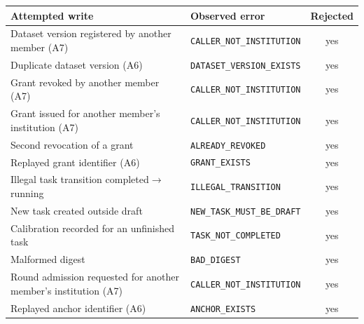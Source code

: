 \begin{widetable}
\centering
\caption{Write-side negative tests on Fabric: each forbidden ledger write and the chaincode error observed.}
\label{tab:negwrites}
\small
\begin{tabular}{p{}p{}c}
\toprule
Attempted write & Observed error & Rejected \\
\midrule
Dataset version registered by another member (A7) & \texttt{CALLER\_NOT\_INSTITUTION} & yes \\
Duplicate dataset version (A6) & \texttt{DATASET\_VERSION\_EXISTS} & yes \\
Grant revoked by another member (A7) & \texttt{CALLER\_NOT\_INSTITUTION} & yes \\
Grant issued for another member's institution (A7) & \texttt{CALLER\_NOT\_INSTITUTION} & yes \\
Second revocation of a grant & \texttt{ALREADY\_REVOKED} & yes \\
Replayed grant identifier (A6) & \texttt{GRANT\_EXISTS} & yes \\
Illegal task transition completed$\to$running & \texttt{ILLEGAL\_TRANSITION} & yes \\
New task created outside draft & \texttt{NEW\_TASK\_MUST\_BE\_DRAFT} & yes \\
Calibration recorded for an unfinished task & \texttt{TASK\_NOT\_COMPLETED} & yes \\
Malformed digest & \texttt{BAD\_DIGEST} & yes \\
Round admission requested for another member's institution (A7) & \texttt{CALLER\_NOT\_INSTITUTION} & yes \\
Replayed anchor identifier (A6) & \texttt{ANCHOR\_EXISTS} & yes \\
\bottomrule
\end{tabular}
\end{widetable}
